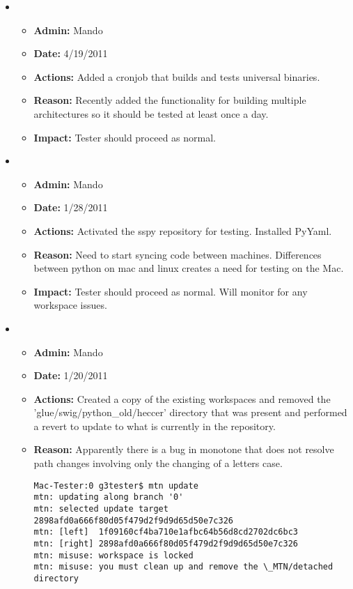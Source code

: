 \documentclass[12pt]{article}
\begin{document}
\begin{itemize}


\item
\begin{itemize}
\item[] {\bf Admin:} Mando
\item[] {\bf Date:} 4/19/2011 
\item[] {\bf Actions:}  Added a cronjob that builds and tests universal binaries.
\item[] {\bf Reason:} Recently added the functionality for building multiple architectures so it should be tested at least once a day.
\item[] {\bf Impact:}  Tester should proceed as normal. 
\end{itemize}

\item
\begin{itemize}
\item[] {\bf Admin:} Mando
\item[] {\bf Date:} 1/28/2011 
\item[] {\bf Actions:}  Activated the sspy repository for testing. Installed PyYaml.
\item[] {\bf Reason:} Need to start syncing code between machines. Differences between python on mac and linux creates a need for testing on the Mac. 
\item[] {\bf Impact:}  Tester should proceed as normal. Will monitor for any workspace issues.
\end{itemize}

\item 
\begin{itemize}
\item[] {\bf Admin:} Mando
\item[] {\bf Date:} 1/20/2011
\item[] {\bf Actions:} Created a copy of the existing workspaces and removed the 'glue/swig/python\_old/heccer' directory that was present and performed a revert to update to what is currently in the repository.
\item[] {\bf Reason:}  Apparently there is a bug in monotone that does not resolve path changes involving only the changing of a letters case.

\begin{verbatim}
Mac-Tester:0 g3tester$ mtn update
mtn: updating along branch '0'
mtn: selected update target 2898afd0a666f80d05f479d2f9d9d65d50e7c326
mtn: [left]  1f09160cf4ba710e1afbc64b56d8cd2702dc6bc3
mtn: [right] 2898afd0a666f80d05f479d2f9d9d65d50e7c326
mtn: misuse: workspace is locked
mtn: misuse: you must clean up and remove the \_MTN/detached directory
\end{verbatim}


\end{itemize}
\end{itemize}
\end{document}

